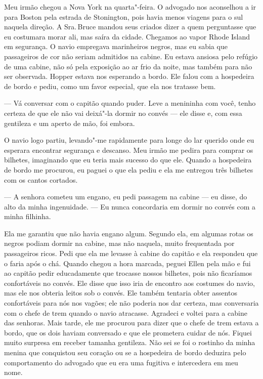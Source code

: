 Meu irmão chegou a Nova York na
quarta"-feira. O advogado nos aconselhou a ir para Boston pela estrada de
Stonington, pois havia menos viagens para o sul naquela direção. A Sra.\,Bruce mandou seus criados dizer a quem perguntasse que eu costumara
morar ali, mas saíra da cidade. Chegamos ao vapor Rhode Island em
segurança. O navio empregava marinheiros negros, mas eu sabia que
passageiros de cor não seriam admitidos na cabine. Eu estava ansiosa
pelo refúgio de uma cabine, não só pela exposição ao ar frio da noite,
mas também para não ser observada. Hopper estava nos esperando a bordo.
Ele falou com a hospedeira de bordo e pediu, como um favor especial, que
ela nos tratasse bem.

--- Vá conversar com o capitão quando puder. Leve a menininha com você,
tenho certeza de que ele não vai deixá"-la dormir no convés --- ele disse
e, com essa gentileza e um aperto de mão, foi embora.

O navio logo partiu, levando"-me
rapidamente para longe do lar querido onde eu esperara encontrar
segurança e descanso. Meu irmão me pedira para comprar os bilhetes,
imaginando que eu teria mais sucesso do que ele. Quando a hospedeira de
bordo me procurou, eu paguei o que ela pediu e ela me entregou três
bilhetes com os cantos cortados.

--- A senhora cometeu um engano, eu pedi passagem na cabine --- eu
disse, do alto da minha ingenuidade. --- Eu nunca concordaria em dormir
no convés com a minha filhinha.

Ela me garantiu que não havia engano algum. Segundo ela, em algumas
rotas os negros podiam dormir na cabine, mas não naquela, muito
frequentada por passageiros ricos. Pedi que ela me levasse à cabine do
capitão e ela respondeu que o faria após o chá. Quando chegou a hora
marcada, peguei Ellen pela mão e fui ao capitão pedir educadamente que
trocasse nossos bilhetes, pois não ficaríamos confortáveis no convés.
Ele disse que isso iria de encontro aos costumes do navio, mas ele nos
obteria leitos sob o convés. Ele também tentaria obter assentos
confortáveis para nós nos vagões; ele não poderia nos dar certeza, mas
conversaria com o chefe de trem quando o navio atracasse. Agradeci e
voltei para a cabine das senhoras. Mais tarde, ele me procurou para
dizer que o chefe de trem estava a bordo, que os dois haviam conversado
e que ele prometera cuidar de nós. Fiquei muito surpresa em receber
tamanha gentileza. Não sei se foi o rostinho da minha menina que
conquistou seu coração ou se a hospedeira de bordo deduzira pelo
comportamento do advogado que eu era uma fugitiva e intercedera em meu
nome.

